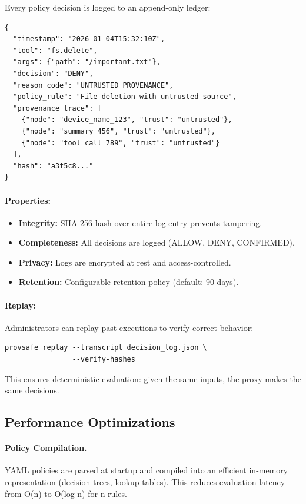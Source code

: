 Every policy decision is logged to an append-only ledger:

\begin{verbatim}
{
  "timestamp": "2026-01-04T15:32:10Z",
  "tool": "fs.delete",
  "args": {"path": "/important.txt"},
  "decision": "DENY",
  "reason_code": "UNTRUSTED_PROVENANCE",
  "policy_rule": "File deletion with untrusted source",
  "provenance_trace": [
    {"node": "device_name_123", "trust": "untrusted"},
    {"node": "summary_456", "trust": "untrusted"},
    {"node": "tool_call_789", "trust": "untrusted"}
  ],
  "hash": "a3f5c8..."
}
\end{verbatim}

\paragraph{Properties:}
\begin{itemize}[leftmargin=1.2em]
  \item \textbf{Integrity:} SHA-256 hash over entire log entry prevents tampering.
  \item \textbf{Completeness:} All decisions are logged (ALLOW, DENY, CONFIRMED).
  \item \textbf{Privacy:} Logs are encrypted at rest and access-controlled.
  \item \textbf{Retention:} Configurable retention policy (default: 90 days).
\end{itemize}

\paragraph{Replay:} Administrators can replay past executions to verify correct behavior:
\begin{verbatim}
provsafe replay --transcript decision_log.json \
                --verify-hashes
\end{verbatim}

This ensures deterministic evaluation: given the same inputs, the proxy makes the same decisions.

\subsection{Performance Optimizations}

\paragraph{Policy Compilation.}
YAML policies are parsed at startup and compiled into an efficient in-memory representation
(decision trees, lookup tables). This reduces evaluation latency from O(n) to O(log n) for
n rules.

